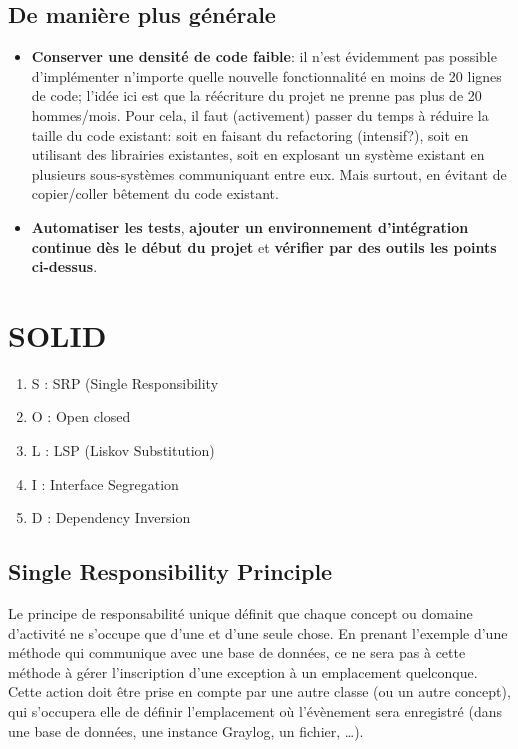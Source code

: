 \documentclass[11pt]{amsbook}
\begin{document}
\hypertarget{x-de-manière-plus-générale}{\subsection{De manière plus générale}}
\begin{itemize}

\item \textbf{Conserver une densité de code faible}: il n’est évidemment pas possible d’implémenter n’importe quelle nouvelle fonctionnalité en moins de 20 lignes de code; l’idée ici est que la réécriture du projet ne prenne pas plus de 20 hommes/mois. Pour cela, il faut (activement) passer du temps à réduire la taille du code existant: soit en faisant du refactoring (intensif?), soit en utilisant des librairies existantes, soit en explosant un système existant en plusieurs sous-systèmes communiquant entre eux. Mais surtout, en évitant de copier/coller bêtement du code existant.

\item \textbf{Automatiser les tests}, \textbf{ajouter un environnement d’intégration continue dès le début du projet} et \textbf{vérifier par des outils les points ci-dessus}.

\end{itemize}


\hypertarget{x-solid}{\section{SOLID}}
\begin{enumerate}

\item{S : SRP (Single Responsibility}

\item{O : Open closed}

\item{L : LSP (Liskov Substitution)}

\item{I : Interface Segregation}

\item{D : Dependency Inversion}

\end{enumerate}


\hypertarget{x-single-responsibility-principle}{\subsection{Single Responsibility Principle}}
Le principe de responsabilité unique définit que chaque concept ou domaine d’activité ne s’occupe que d’une et d’une seule chose.
En prenant l’exemple d’une méthode qui communique avec une base de données, ce ne sera pas à cette méthode à gérer l’inscription d’une exception à un emplacement quelconque.
Cette action doit être prise en compte par une autre classe (ou un autre concept), qui s’occupera elle de définir l’emplacement où l’évènement sera enregistré (dans une base de données, une instance Graylog, un fichier, …​).
\end{document}
